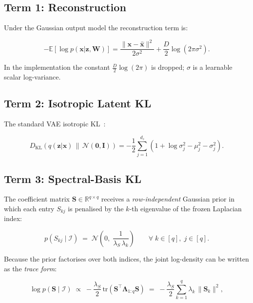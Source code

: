 \documentclass[11pt,a4paper]{article}
\newcommand{\KL}[2]{D_{\mathrm{KL}}\!\left(#1\,\|\,#2\right)}
\newcommand{\E}[1]{\mathbb{E}\!\left[#1\right]}
\newcommand{\Smat}{\mathbf{S}}
\newcommand{\Wmat}{\mathbf{W}}
\newcommand{\normal}{\mathcal{N}}
\newcommand{\R}{\mathbb{R}}
\newcommand{\T}{^{\intercal}}
\begin{document}
\subsection{Term 1: Reconstruction}
\label{sec:elbo:recon}

Under the Gaussian output model the reconstruction term is:

\begin{equation}
  -\E{\log p(\mathbf{x}|\mathbf{z},\Wmat)}
  = \frac{\|\mathbf{x} - \hat{\mathbf{x}}\|^2}{2\sigma^2}
  + \frac{D}{2}\log(2\pi\sigma^2).
  \label{eq:recon}
\end{equation}

In the implementation the constant $\frac{D}{2}\log(2\pi)$ is dropped;
$\sigma$ is a learnable scalar log-variance.

\subsection{Term 2: Isotropic Latent KL}
\label{sec:elbo:klz}

The standard VAE isotropic KL~\cite{kingma2013}:

\begin{equation}
  \KL{q(\mathbf{z}|\mathbf{x})}{\normal(\mathbf{0},\mathbf{I})}
  = -\frac{1}{2}\sum_{j=1}^{d_z}\left(1 + \log\sigma_j^2 - \mu_j^2 - \sigma_j^2\right).
  \label{eq:klz}
\end{equation}

\subsection{Term 3: Spectral-Basis KL}
\label{sec:elbo:kls}

The coefficient matrix $\Smat\in\R^{q\times q}$ receives a
\emph{row-independent} Gaussian prior in which each entry $S_{kj}$ is
penalised by the $k$-th eigenvalue of the frozen Laplacian index:

\begin{equation}
  p(S_{kj} \mid \mathcal{I})
  \;=\; \normal\!\left(0,\;\frac{1}{\lambda_S\,\lambda_k}\right)
  \qquad \forall\; k \in [q],\; j \in [q].
  \label{eq:priorS}
\end{equation}

Because the prior factorises over both indices, the joint log-density
can be written as the \emph{trace form}:

\begin{equation}
  \log p(\Smat\mid\mathcal{I})
  \;\propto\;
  -\frac{\lambda_S}{2}\,\mathrm{tr}\!\left(\Smat\T\boldsymbol{\Lambda}_{1:q}\Smat\right)
  \;=\;
  -\frac{\lambda_S}{2}\sum_{k=1}^{q}\lambda_k\,\|\Smat_k\|^2,
  \label{eq:priorS-trace}
\end{equation}
\end{document}
